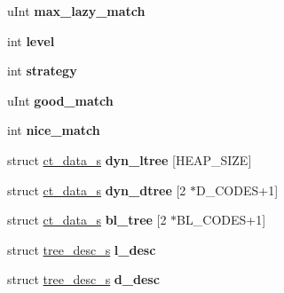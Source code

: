 \begin{DoxyCompactItemize}
\item 
\mbox{\label{structinternal__state_ab74215ec1c106bf588a7642927d47b84}} 
u\+Int {\bfseries max\+\_\+lazy\+\_\+match}
\item 
\mbox{\label{structinternal__state_a7ad2ab1df80c8cab4ffb97ff84e88c62}} 
int {\bfseries level}
\item 
\mbox{\label{structinternal__state_a67219312df7fd2f86e06e6f14700eb28}} 
int {\bfseries strategy}
\item 
\mbox{\label{structinternal__state_a68ba00254242017f330dca5e0191bca4}} 
u\+Int {\bfseries good\+\_\+match}
\item 
\mbox{\label{structinternal__state_a39ab99e52138c0628f645bc1e0c69a04}} 
int {\bfseries nice\+\_\+match}
\item 
\mbox{\label{structinternal__state_ae491d8ff42bdc841c8101f028bd8cdc6}} 
struct \hyperlink{structct__data__s}{ct\+\_\+data\+\_\+s} {\bfseries dyn\+\_\+ltree} \mbox{[}H\+E\+A\+P\+\_\+\+S\+I\+ZE\mbox{]}
\item 
\mbox{\label{structinternal__state_a6a5482b11495855c29591339805d8aa8}} 
struct \hyperlink{structct__data__s}{ct\+\_\+data\+\_\+s} {\bfseries dyn\+\_\+dtree} \mbox{[}2 $\ast$D\+\_\+\+C\+O\+D\+ES+1\mbox{]}
\item 
\mbox{\label{structinternal__state_a6e5316dd8da94406e538f5eab908947d}} 
struct \hyperlink{structct__data__s}{ct\+\_\+data\+\_\+s} {\bfseries bl\+\_\+tree} \mbox{[}2 $\ast$B\+L\+\_\+\+C\+O\+D\+ES+1\mbox{]}
\item 
\mbox{\label{structinternal__state_a0266c4e0250652904e6b4908d8da84a9}} 
struct \hyperlink{structtree__desc__s}{tree\+\_\+desc\+\_\+s} {\bfseries l\+\_\+desc}
\item 
\mbox{\label{structinternal__state_ab2fddb383d3055b6ec81c7fef14e99d8}} 
struct \hyperlink{structtree__desc__s}{tree\+\_\+desc\+\_\+s} {\bfseries d\+\_\+desc}

\end{DoxyCompactItemize}
